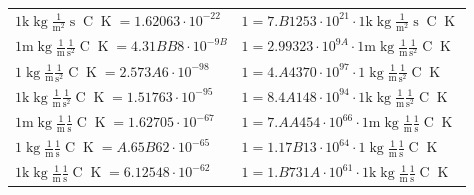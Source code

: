 \begin{center}
\begin{longtable}{l l}
{\color{gray}$1 \bm{\mathrm{ k}}\operatorname{kg}\frac1{\operatorname{m}^2}{\operatorname{s}}{\operatorname{C}}{\operatorname{K}} = 1.62063\cdot10^{-22} $}   & {\color{gray}$ 1 = 7.B1253\cdot10^{21} \cdot 1 \bm{\mathrm{ k}}\operatorname{kg}\frac1{\operatorname{m}^2}{\operatorname{s}}{\operatorname{C}}{\operatorname{K}}$}  \\
{\color{gray}$1 \bm{\mathrm{ m}}\operatorname{kg}\frac1{\operatorname{m}}\frac1{\operatorname{s}^2}{\operatorname{C}}{\operatorname{K}} = 4.31BB8\cdot10^{-9B} $}   & {\color{gray}$ 1 = 2.99323\cdot10^{9A} \cdot 1 \bm{\mathrm{ m}}\operatorname{kg}\frac1{\operatorname{m}}\frac1{\operatorname{s}^2}{\operatorname{C}}{\operatorname{K}}$}  \\
{\color{black}$1 \bm{\mathrm{ }}\operatorname{kg}\frac1{\operatorname{m}}\frac1{\operatorname{s}^2}{\operatorname{C}}{\operatorname{K}} = 2.573A6\cdot10^{-98} $}   & {\color{black}$ 1 = 4.A4370\cdot10^{97} \cdot 1 \bm{\mathrm{ }}\operatorname{kg}\frac1{\operatorname{m}}\frac1{\operatorname{s}^2}{\operatorname{C}}{\operatorname{K}}$}  \\
{\color{gray}$1 \bm{\mathrm{ k}}\operatorname{kg}\frac1{\operatorname{m}}\frac1{\operatorname{s}^2}{\operatorname{C}}{\operatorname{K}} = 1.51763\cdot10^{-95} $}   & {\color{gray}$ 1 = 8.4A148\cdot10^{94} \cdot 1 \bm{\mathrm{ k}}\operatorname{kg}\frac1{\operatorname{m}}\frac1{\operatorname{s}^2}{\operatorname{C}}{\operatorname{K}}$}  \\
{\color{gray}$1 \bm{\mathrm{ m}}\operatorname{kg}\frac1{\operatorname{m}}\frac1{\operatorname{s}}{\operatorname{C}}{\operatorname{K}} = 1.62705\cdot10^{-67} $}   & {\color{gray}$ 1 = 7.AA454\cdot10^{66} \cdot 1 \bm{\mathrm{ m}}\operatorname{kg}\frac1{\operatorname{m}}\frac1{\operatorname{s}}{\operatorname{C}}{\operatorname{K}}$}  \\
{\color{black}$1 \bm{\mathrm{ }}\operatorname{kg}\frac1{\operatorname{m}}\frac1{\operatorname{s}}{\operatorname{C}}{\operatorname{K}} = A.65B62\cdot10^{-65} $}   & {\color{black}$ 1 = 1.17B13\cdot10^{64} \cdot 1 \bm{\mathrm{ }}\operatorname{kg}\frac1{\operatorname{m}}\frac1{\operatorname{s}}{\operatorname{C}}{\operatorname{K}}$}  \\
{\color{gray}$1 \bm{\mathrm{ k}}\operatorname{kg}\frac1{\operatorname{m}}\frac1{\operatorname{s}}{\operatorname{C}}{\operatorname{K}} = 6.12548\cdot10^{-62} $}   & {\color{gray}$ 1 = 1.B731A\cdot10^{61} \cdot 1 \bm{\mathrm{ k}}\operatorname{kg}\frac1{\operatorname{m}}\frac1{\operatorname{s}}{\operatorname{C}}{\operatorname{K}}$}  \\

\end{longtable}
\end{center}
